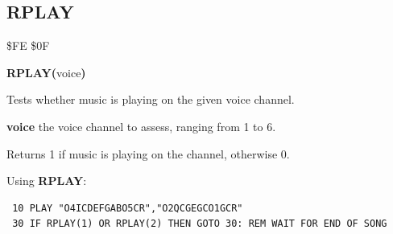 \subsection{RPLAY}
\begin{description}[leftmargin=2cm,style=nextline]
\item [Token:] \$FE \$0F
\item [Format:] {\bf RPLAY(}voice{\bf)}
\item [Returns:] Tests whether music is playing on the given voice channel.

               {\bf voice} the voice channel to assess, ranging from 1 to 6.

               Returns 1 if music is playing on the channel, otherwise 0.

\item [Example:] Using {\bf RPLAY}:
\begin{tcolorbox}[colback=black,coltext=white]
\verbatimfont{\codefont}
\begin{verbatim}
 10 PLAY "O4ICDEFGABO5CR","O2QCGEGCO1GCR"
 30 IF RPLAY(1) OR RPLAY(2) THEN GOTO 30: REM WAIT FOR END OF SONG
\end{verbatim}
\end{tcolorbox}
\end{description}


\newpage
